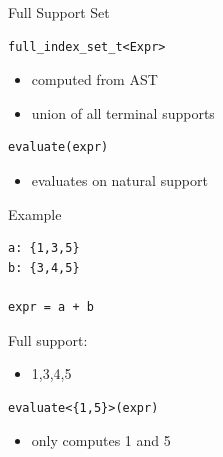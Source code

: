 \documentclass{beamer}
\begin{document}
\begin{frame}[fragile]{Full Support Set}

\begin{lstlisting}
full_index_set_t<Expr>
\end{lstlisting}

\vspace{1em}

\begin{itemize}
\item computed from AST
\item union of all terminal supports
\end{itemize}

\vspace{1em}

\begin{lstlisting}
evaluate(expr)
\end{lstlisting}

\vspace{1em}

\begin{itemize}
\item evaluates on natural support
\end{itemize}

\end{frame}


\begin{frame}[fragile]{Example}

\begin{lstlisting}
a: {1,3,5}
b: {3,4,5}

expr = a + b
\end{lstlisting}

\vspace{1em}

Full support:

\begin{itemize}
\item {1,3,4,5}
\end{itemize}

\vspace{1em}

\begin{lstlisting}
evaluate<{1,5}>(expr)
\end{lstlisting}

\begin{itemize}
\item only computes 1 and 5
\end{itemize}

\end{frame}
\end{document}
